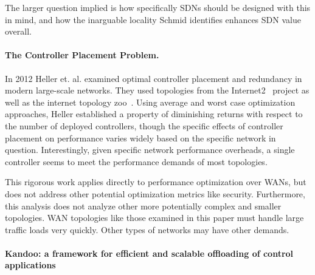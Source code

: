 \documentclass[10pt,letterpaper]{article}
\begin{document}
The larger question implied is how specifically SDNs should be designed with this in mind, and how the inarguable locality Schmid identifies enhances SDN value overall.

\paragraph{The Controller Placement Problem.}
In 2012 Heller et. al. examined optimal controller placement and redundancy in modern large-scale networks. They used topologies from the Internet2~\cite{internet2} project as well as the internet topology zoo~\cite{internet-topo-zoo}. Using average and worst case optimization approaches, Heller established a property of diminishing returns with respect to the number of deployed controllers, though the specific effects of controller placement on performance varies widely based on the specific network in question.  Interestingly, given specific network performance overheads, a single controller seems to meet the performance demands of most topologies\cite{HeShMc:12}. 

This rigorous work applies directly to performance optimization over WANs, but does not address other potential optimization metrics like security.  Furthermore, this analysis does not analyze other more potentially complex and smaller topologies.  WAN topologies like those examined in this paper must handle large traffic loads very quickly.  Other types of networks may have other demands.

\paragraph{Kandoo: a framework for efficient and scalable offloading of control applications}

\cite{HaGa:12}

\printbibliography
\end{document}
